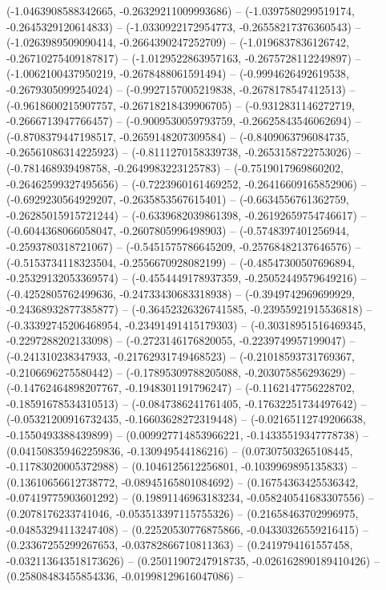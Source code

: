 \begin{scope}[blend group = overlay]
(-1.0463908588342665, -0.26329211009993686) -- 
(-1.0397580299519174, -0.2645329120614833) -- 
(-1.0330922172954773, -0.26558217376360543) -- 
(-1.0263989509090414, -0.2664390247252709) -- 
(-1.0196837836126742, -0.26710275409187817) -- 
(-1.0129522863957163, -0.2675728112249897) -- 
(-1.0062100437950219, -0.2678488061591494) -- 
(-0.9994626492619538, -0.2679305099254024) -- 
(-0.9927157005219838, -0.2678178547412513) -- 
(-0.9618600215907757, -0.26718218439906705) -- 
(-0.9312831146272719, -0.2666713947766457) -- 
(-0.9009530059793759, -0.26625843546062694) -- 
(-0.8708379447198517, -0.2659148207309584) -- 
(-0.8409063796084735, -0.26561086314225923) -- 
(-0.8111270158339738, -0.2653158722753026) -- 
(-0.781468939498758, -0.2649983223125783) -- 
(-0.7519017969860202, -0.26462599327495656) -- 
(-0.7223960161469252, -0.26416609165852906) -- 
(-0.6929230564929207, -0.2635853567615401) -- 
(-0.6634556761362759, -0.26285015915721244) -- 
(-0.6339682039861398, -0.26192659754746617) -- 
(-0.6044368066058047, -0.2607805996498903) -- 
(-0.5748397401256944, -0.2593780318721067) -- 
(-0.5451575786645209, -0.25768482137646576) -- 
(-0.5153734118323504, -0.2556670928082199) -- 
(-0.48547300507696894, -0.25329132053369574) -- 
(-0.4554449178937359, -0.25052449579649216) -- 
(-0.4252805762499636, -0.24733430683318938) -- 
(-0.3949742969699929, -0.24368932877385877) -- 
(-0.36452326326741585, -0.23955921915536818) -- 
(-0.33392745206468954, -0.23491491415179303) -- 
(-0.30318951516469345, -0.2297288202133098) -- 
(-0.2723146176820055, -0.2239749957199047) -- 
(-0.241310238347933, -0.21762931749468523) -- 
(-0.21018593731769367, -0.2106696275580442) -- 
(-0.17895309788205088, -0.203075856293629) -- 
(-0.14762464898207767, -0.1948301191796247) -- 
(-0.1162147756228702, -0.18591678534310513) -- 
(-0.0847386241761405, -0.17632251734497642) -- 
(-0.05321200916732435, -0.16603628272319448) -- 
(-0.02165112749206638, -0.1550493388439899) -- 
(0.009927714853966221, -0.14335519347778738) -- 
(0.041508359462259836, -0.130949544186216) -- 
(0.07307503265108445, -0.11783020005372988) -- 
(0.1046125612256801, -0.1039969895135833) -- 
(0.13610656612738772, -0.08945165801084692) -- 
(0.16754363425536342, -0.07419775903601292) -- 
(0.19891146963183234, -0.058240541683307556) -- 
(0.2078176233741046, -0.053513397115755326) -- 
(0.21658463702996975, -0.04853294113247408) -- 
(0.22520530776875866, -0.04330326559216415) -- 
(0.23367255299267653, -0.03782866710811363) -- 
(0.2419794161557458, -0.032113643518173626) -- 
(0.25011907247918735, -0.026162890189410426) -- 
(0.25808483455854336, -0.01998129616047086) -- 

\end{scope}
